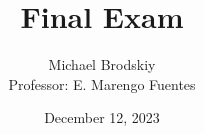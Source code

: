 


\title{Final Exam}
\date{December 12, 2023}
\author{Michael Brodskiy\\ \small Professor: E. Marengo Fuentes}



\maketitle

